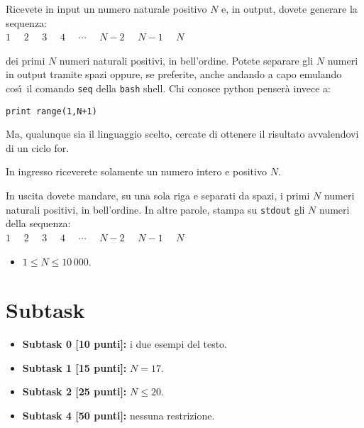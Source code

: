 \renewcommand{\nomebreve}{for1\_std}
\renewcommand{\titolo}{Primo esercizio sul {\tt for} - emulare il comando {\tt seq} della {\tt bash}}

\introduzione{}

Ricevete in input un numero naturale positivo $N$ e,
in output, dovete generare la sequenza:\\

  $1$  \ \ $2$  \ \ $3$  \ \ $4$  \ \ $\cdots$  \ \ $N-2$  \ \ $N-1$  \ \ $N$

dei primi $N$ numeri naturali positivi, in bell'ordine.
Potete separare gli $N$ numeri in output tramite spazi oppure, se preferite, anche andando a capo emulando cos\'\i\ il comando \verb'seq' della \verb'bash' shell.
Chi conosce python penser\`a invece a:

\verb'print range(1,N+1)'

Ma, qualunque sia il linguaggio scelto, cercate di ottenere il risultato avvalendovi di un ciclo for.

In ingresso riceverete solamente un numero intero e positivo $N$.

In uscita dovete mandare, su una sola riga e separati da spazi, i primi $N$ numeri naturali positivi, in bell'ordine.
In altre parole, stampa su \verb'stdout' gli $N$ numeri della sequenza:\\

  $1$  \ \ $2$  \ \ $3$  \ \ $4$  \ \ $\cdots$  \ \ $N-2$  \ \ $N-1$  \ \ $N$



\begin{itemize}[nolistsep, noitemsep]
  \item $1 \le N \le 10\,000$.
\end{itemize}
  
  \section*{Subtask}
  \begin{itemize}
    \item \textbf{Subtask 0 [10 punti]:} i due esempi del testo.
    \item \textbf{Subtask 1 [15 punti]:} $N = 17$.
    \item \textbf{Subtask 2 [25 punti]:} $N \leq 20$.
    \item \textbf{Subtask 4 [50 punti]:} nessuna restrizione.
  \end{itemize}
  
